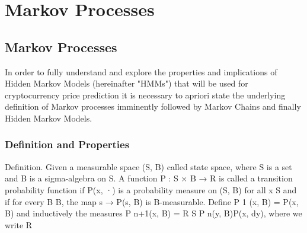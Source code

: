 

\chapter{Markov Processes}  %

\ifpdf
    \graphicspath{{Chapter1/Figs/Raster/}{Chapter1/Figs/PDF/}{Chapter1/Figs/}}
\else
    \graphicspath{{Chapter1/Figs/Vector/}{Chapter1/Figs/}}
\fi


\section{Markov Processes} %

In order to fully understand and explore the properties and implications of Hidden Markov Models (hereinafter "HMMs") that will be used for cryptocurrency price prediction it is necessary to apriori state the underlying definition of Markov processes imminently followed by Markov Chains and finally Hidden Markov Models. 

\subsection{Definition and Properties}

Definition. Given a measurable space (S, B) called state space, where S is
a set and B is a {sigma}-algebra on S. A function P : S × B → R is called a
transition probability function if P(x, ·) is a probability measure on (S, B)
for all x  S and if for every B  B, the map s → P(s, B) is B-measurable.
Define P
1
(x, B) = P(x, B) and inductively the measures P
n+1(x, B) =
R
S
P
n(y, B)P(x, dy), where we write R








\nomenclature[g-p]{$\pi$}{ $\simeq 3.14\ldots$}                                             %


